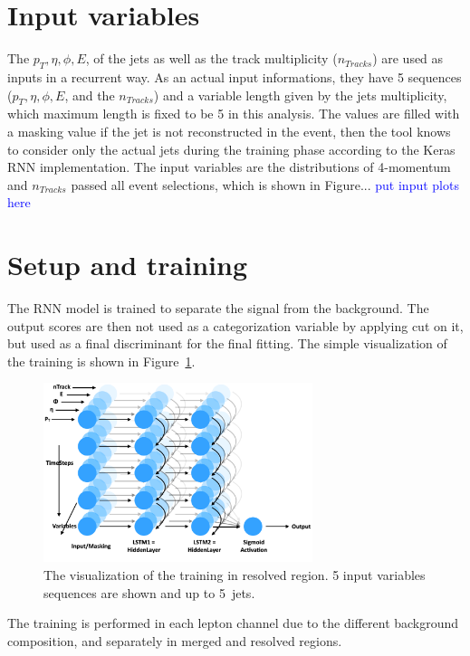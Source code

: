 \section{Input variables}
The $p_T, \eta, \phi, E$, of the jets as well as the track multiplicity ($n_{Tracks}$) are used as inputs in a recurrent way. As an actual input informations, they have 5 sequences ($p_T, \eta, \phi, E$, and the $n_{Tracks}$) and a variable length given by the jets multiplicity, which maximum length is fixed to be 5 in this analysis. The values are filled with a masking value if the jet is not reconstructed in the event, then the tool knows to consider only the actual jets during the training phase according to the Keras RNN implementation. 
The input variables are the distributions of 4-momentum and $n_{Tracks}$ passed all event selections, which is shown in Figure... \textcolor{blue}{put input plots here}

\section{Setup and training}
The RNN model is trained to separate the signal from the background. The output scores are then not used as a categorization variable by applying cut on it, but used as a final discriminant for the final fitting. The simple visualization of the training is shown in Figure~\ref{fig:simplenode}.
\begin{figure}[H]
    \centering
    \includegraphics[width=0.7\textwidth]{figures/simplenode}
    \caption{The visualization of the training in resolved region. 5 input variables sequences are shown and up to 5~jets.
    }
    \label{fig:simplenode}
\end{figure}
The training is performed in each lepton channel due to the different background composition, and separately in merged and resolved regions.

